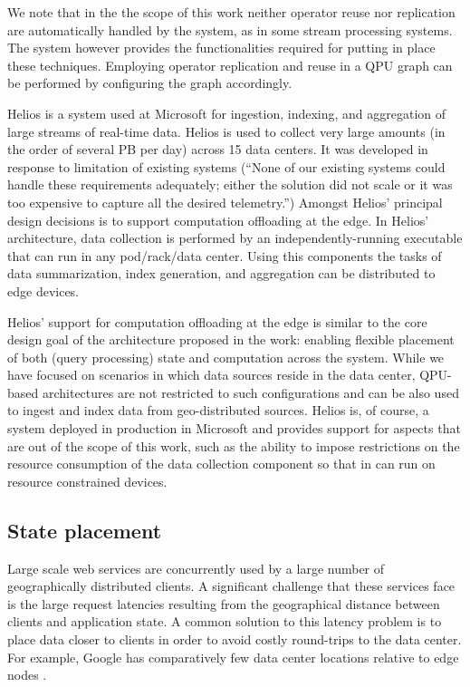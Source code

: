 We note that in the the scope of this work neither operator reuse nor replication are automatically handled by the system,
as in some stream processing systems.
The system however provides the functionalities required for putting in place these techniques.
Employing operator replication and reuse in a QPU graph can be performed by configuring the graph accordingly.

\bigskip
\noindent
Helios \cite{potharaju:helios} is a system used at Microsoft for ingestion, indexing, and aggregation of large streams
of real-time data.
Helios is used to collect very large amounts (in the order of several PB per day) across 15 data centers.
It was developed in response to limitation of existing systems
(``None of our existing systems could handle these requirements adequately; either the solution did not scale or it was too expensive to capture all the desired telemetry.'')
Amongst Helios' principal design decisions is to support computation offloading at the edge.
In Helios' architecture, data collection is performed by an independently-running executable that can run in any pod/rack/data center.
Using this components the tasks of data summarization, index generation, and aggregation can be distributed to edge devices.

Helios' support for computation offloading at the edge is similar to the core design goal of the architecture proposed in the work:
enabling flexible placement of both (query processing) state and computation across the system.
While we have focused on scenarios in which data sources reside in the data center,
QPU-based architectures are not restricted to such configurations and can be also used to ingest and index data from geo-distributed
sources.
Helios is, of course, a system deployed in production in Microsoft and provides support for aspects that are out of the
scope of this work, such as the ability to impose restrictions on the resource consumption of the data collection component
so that in can run on resource constrained devices.

\subsection{State placement}
Large scale web services are concurrently used by a large number of geographically distributed clients.
A significant challenge that these services face is the large request latencies resulting from the geographical distance
between clients and application state.
A common solution to this latency problem is to place data closer to clients in order to avoid costly round-trips
to the data center.
For example, Google has comparatively few data center locations relative to edge nodes \cite{google:infra}.

